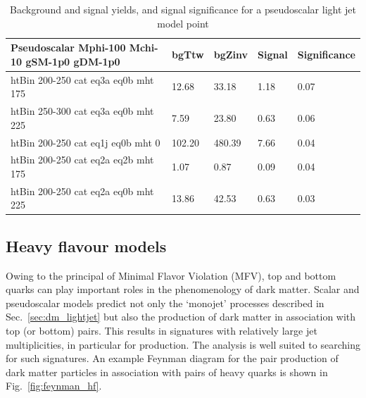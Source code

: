 \begin{table}
\small
\begin{center}
\caption{Background and signal yields, and signal significance for a pseudoscalar light jet model point}
\label{tab:MSB_P_g1_2fb}
\begin{tabular}{|l|l|l|l|l|}
\textbf{Pseudoscalar Mphi-100 Mchi-10 gSM-1p0 gDM-1p0}  &  bgTtw    &  bgZinv   &  Signal &
Significance \\ 
\hline
htBin 200-250 cat eq3a eq0b mht 175 &   12.68    &  33.18    &  1.18    &0.07 \\ 
htBin 250-300 cat eq3a eq0b mht 225 &   7.59     &  23.80    &  0.63    &0.06 \\ 
htBin 200-250 cat eq1j eq0b mht 0 &     102.20   &  480.39   &  7.66    &0.04 \\ 
htBin 200-250 cat eq2a eq2b mht 175 &   1.07     &  0.87     &  0.09    &0.04 \\ 
htBin 200-250 cat eq2a eq0b mht 225 &   13.86    &  42.53    &  0.63    &0.03 \\ 
\end{tabular}
\end{center}
\end{table}


\clearpage



\clearpage \subsection{Heavy flavour models} \label{sec:dm_heavyjet}

Owing to the principal of Minimal Flavor Violation (MFV), top and bottom quarks
can play important roles in the phenomenology of dark matter. Scalar and
pseudoscalar models predict not only the `monojet' processes described in
Sec.~\ref{sec:dm_lightjet} but also the production of dark matter in association
with top (or bottom) pairs. This results in signatures with relatively large jet
multiplicities, in particular for \DMtt production. The \alphat analysis is well 
suited to searching for such signatures. An example Feynman diagram for the pair
production of dark matter particles in association with pairs of heavy quarks is
shown in Fig.~\ref{fig:feynman_hf}.


